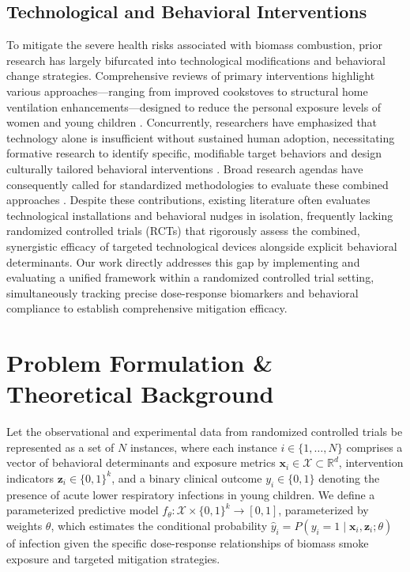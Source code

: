\documentclass[10pt,twocolumn]{article}
\begin{document}
\subsection{Technological and Behavioral Interventions}
To mitigate the severe health risks associated with biomass combustion, prior research has largely bifurcated into technological modifications and behavioral change strategies. Comprehensive reviews of primary interventions highlight various approaches—ranging from improved cookstoves to structural home ventilation enhancements—designed to reduce the personal exposure levels of women and young children \cite{ref_1}. Concurrently, researchers have emphasized that technology alone is insufficient without sustained human adoption, necessitating formative research to identify specific, modifiable target behaviors and design culturally tailored behavioral interventions \cite{ref_2, ref_5}. Broad research agendas have consequently called for standardized methodologies to evaluate these combined approaches \cite{ref_3}. Despite these contributions, existing literature often evaluates technological installations and behavioral nudges in isolation, frequently lacking randomized controlled trials (RCTs) that rigorously assess the combined, synergistic efficacy of targeted technological devices alongside explicit behavioral determinants. Our work directly addresses this gap by implementing and evaluating a unified framework within a randomized controlled trial setting, simultaneously tracking precise dose-response biomarkers and behavioral compliance to establish comprehensive mitigation efficacy.

\section{Problem Formulation \& Theoretical Background}
Let the observational and experimental data from randomized controlled trials be represented as a set of $N$ instances, where each instance $i \in \{1, \dots, N\}$ comprises a vector of behavioral determinants and exposure metrics $\mathbf{x}_i \in \mathcal{X} \subset \mathbb{R}^d$, intervention indicators $\mathbf{z}_i \in \{0, 1\}^k$, and a binary clinical outcome $y_i \in \{0, 1\}$ denoting the presence of acute lower respiratory infections in young children. We define a parameterized predictive model $f_\theta: \mathcal{X} \times \{0, 1\}^k \to [0, 1]$, parameterized by weights $\theta$, which estimates the conditional probability $\hat{y}_i = P(y_i = 1 \mid \mathbf{x}_i, \mathbf{z}_i; \theta)$ of infection given the specific dose-response relationships of biomass smoke exposure and targeted mitigation strategies.
\end{document}
